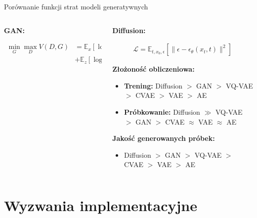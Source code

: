 \documentclass{beamer}
\begin{document}
\begin{frame}{Porównanie funkcji strat modeli generatywnych}
\begin{columns}
\begin{column}{0.3\textwidth}
      \textbf{GAN:}
      \vspace{-0.2cm}
      \begin{tcolorbox}[colback=yellow!10!white, colframe=black!60, boxrule=0.5pt, arc=3mm, boxsep=2pt, left=2pt, right=2pt]
        \begin{align*}
          \min_G \max_D V(D,G) &= \mathbb{E}_{x}[\log D(x)] \\
          &+ \mathbb{E}_{z}[\log(1 - D(G(z)))]
        \end{align*}
      \end{tcolorbox}
    \end{column}
    \begin{column}{0.4\textwidth}
      \textbf{Diffusion:}
      \vspace{-0.2cm}
      \begin{tcolorbox}[colback=yellow!10!white, colframe=black!60, boxrule=0.5pt, arc=3mm, boxsep=2pt, left=2pt, right=2pt]
        \begin{align*}
          \mathcal{L} = \mathbb{E}_{t,x_0,\epsilon} \left[ \|\epsilon - \epsilon_\theta(x_t, t)\|^2 \right]
        \end{align*}
      \end{tcolorbox}
      
      \medskip
      \textbf{Złożoność obliczeniowa:}
      \begin{itemize}
        \item \textbf{Trening:} Diffusion $>$ GAN $>$ VQ-VAE $>$ CVAE $>$ VAE $>$ AE
        \item \textbf{Próbkowanie:} Diffusion $\gg$ VQ-VAE $>$ GAN $>$ CVAE $\approx$ VAE $\approx$ AE
      \end{itemize}
      
      \textbf{Jakość generowanych próbek:}
      \begin{itemize}
        \item Diffusion $>$ GAN $>$ VQ-VAE $>$ CVAE $>$ VAE $>$ AE
      \end{itemize}
    \end{column}
  \end{columns}
\end{frame}


\section{Wyzwania implementacyjne}
\end{document}
